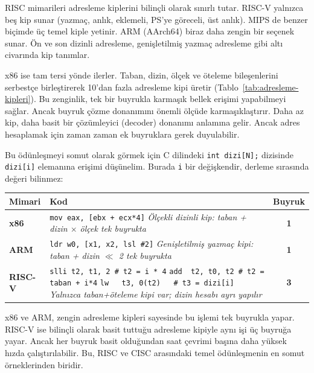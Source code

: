 \begin{karsilastirma}
RISC mimarileri adresleme kiplerini bilinçli olarak sınırlı tutar. RISC-V yalnızca beş kip sunar (yazmaç, anlık, eklemeli, PS'ye göreceli, üst anlık). MIPS de benzer biçimde üç temel kiple yetinir. ARM (AArch64) biraz daha zengin bir seçenek sunar. Ön ve son dizinli adresleme, genişletilmiş yazmaç adresleme gibi altı civarında kip tanımlar.

x86 ise tam tersi yönde ilerler. Taban, dizin, ölçek ve öteleme bileşenlerini serbestçe birleştirerek 10'dan fazla adresleme kipi üretir (Tablo~\ref{tab:adresleme-kipleri}). Bu zenginlik, tek bir buyrukla karmaşık bellek erişimi yapabilmeyi sağlar. Ancak buyruk çözme donanımını önemli ölçüde karmaşıklaştırır. Daha az kip, daha basit bir çözümleyici (decoder) donanımı anlamına gelir. Ancak adres hesaplamak için zaman zaman ek buyruklara gerek duyulabilir.

Bu ödünleşmeyi somut olarak görmek için C dilindeki \texttt{int dizi[N];} dizisinde \texttt{dizi[i]} elemanına erişimi düşünelim. Burada \texttt{i} bir değişkendir, derleme sırasında değeri bilinmez:

\begin{center}
\small
\begin{tabular}{lp{9.5cm}c}
\toprule
\textbf{Mimari} & \textbf{Kod} & \textbf{Buyruk} \\
\midrule
\textbf{x86} & \texttt{mov eax, [ebx + ecx*4]} \newline \textit{Ölçekli dizinli kip: taban + dizin $\times$ ölçek tek buyrukta} & \textbf{1} \\
\midrule
\textbf{ARM} & \texttt{ldr w0, [x1, x2, lsl \#2]} \newline \textit{Genişletilmiş yazmaç kipi: taban + dizin $\ll$ 2 tek buyrukta} & \textbf{1} \\
\midrule
\textbf{RISC-V} & \texttt{slli t2, t1, 2 \quad \# t2 = i * 4} \newline \texttt{add ~t2, t0, t2 \quad \# t2 = taban + i*4} \newline \texttt{lw ~~t3, 0(t2) ~~\quad \# t3 = dizi[i]} \newline \textit{Yalnızca taban+öteleme kipi var; dizin hesabı ayrı yapılır} & \textbf{3} \\
\bottomrule
\end{tabular}
\end{center}

x86 ve ARM, zengin adresleme kipleri sayesinde bu işlemi tek buyrukla yapar. RISC-V ise bilinçli olarak basit tuttuğu adresleme kipiyle aynı işi üç buyruğa yayar. Ancak her buyruk basit olduğundan saat çevrimi başına daha yüksek hızda çalıştırılabilir. Bu, RISC ve CISC arasındaki temel ödünleşmenin en somut örneklerinden biridir.
\end{karsilastirma}

